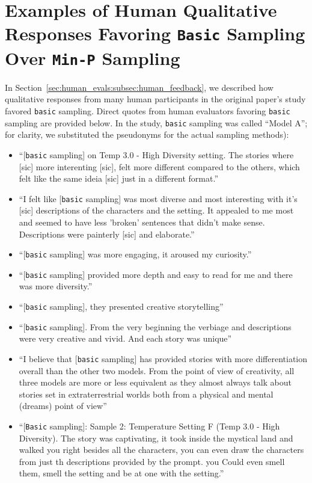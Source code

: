 \section{Examples of Human Qualitative Responses Favoring \texttt{Basic} Sampling Over \texttt{Min-P} Sampling}
\label{app:sec:human_qual_responses}

In Section~\ref{sec:human_evals:subsec:human_feedback}, we described how qualitative responses from many human participants in the original paper's study favored \texttt{basic} sampling. Direct quotes from human evaluators favoring \texttt{basic} sampling are provided below. In the study, \texttt{basic} sampling was called “Model A”; for clarity, we substituted the pseudonyms for the actual sampling methods):
%
\begin{itemize}
    \item ``[\texttt{basic} sampling] on Temp 3.0 - High Diversity setting. The stories where [sic] more interenting [sic], felt more different compared to the others, which felt like the same ideia [sic] just in a different format.”
    \item ``I felt like [\texttt{basic} sampling] was most diverse and most interesting with it's [sic] descriptions of the characters and the setting. It appealed to me most and seemed to have less 'broken' sentences that didn't make sense. Descriptions were painterly [sic] and elaborate.”
    \item ``[\texttt{basic} sampling] was more engaging, it aroused my curiosity.”
    \item ``[\texttt{basic} sampling] provided more depth and easy to read for me and there was more diversity.”
    \item ``[\texttt{basic} sampling], they presented creative storytelling”
    \item ``[\texttt{basic} sampling]. From the very beginning the verbiage and descriptions were very creative and vivid. And each story was unique”
    \item ``I believe that [\texttt{basic} sampling] has provided stories with more differentiation overall than the other two models. From the point of view of creativity, all three models are more or less equivalent as they almost always talk about stories set in extraterrestrial worlds both from a physical and mental (dreams) point of view''
    \item ``[\texttt{Basic} sampling]: Sample 2: Temperature Setting F (Temp 3.0 - High Diversity). The story was captivating, it took inside the mystical land and walked you right besides all the characters, you can even draw the characters from just th descriptions provided by the prompt. you Could even smell them, smell the setting and be at one with the setting.''

\end{itemize}
